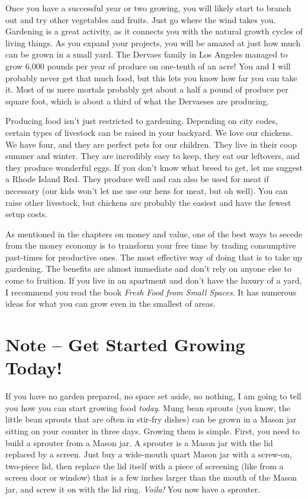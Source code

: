 Once you have a successful year or two growing, you will likely start to
branch out and try other vegetables and fruits. Just go where the wind
takes you. Gardening is a great activity, as it connects you with the
natural growth cycles of living things. As you expand your projects,
you will be amazed at just how much can be grown in a small yard. The
Dervaes family in Los Angeles managed to grow 6,000 pounds per year of
produce on one-tenth of an acre!  You and I will probably never get
that much food, but this lets you know how far you can take it. Most of
us mere mortals probably get about a half a pound of produce per square
foot, which is about a third of what
the Dervaeses are
producing.

Producing food isn’t just restricted to gardening. Depending on city
codes, certain types of livestock can be raised in your backyard. We
love our chickens. We have four, and they are perfect pets for our
children. They live in
their coop summer and winter. They are incredibly easy to keep, they
eat our leftovers, and they produce wonderful eggs. If you don’t know
what breed to get, let me suggest a Rhode Island Red. They produce well
and can also be used for meat if necessary (our kids won’t let me use
our hens for meat, but oh well). You can raise other livestock, but
chickens are probably the easiest and have the fewest setup costs.

As mentioned in the chapters on money and value, one of the best ways to
secede from the money economy is to transform your free time by trading
consumptive past-times for productive ones. The most effective way of
doing that is to take up gardening. The benefits are almost immediate
and don’t rely on anyone else to come to fruition. If you live in an
apartment and don’t have the luxury of a yard, I recommend you read the
book \textit{Fresh Food from Small Spaces}. It has numerous ideas for
what you can grow even in the smallest of areas.

\section{Note – Get Started Growing Today!}

If you have no garden prepared, no space set aside, no nothing, I am
going to tell you how you can start growing food \textit{today}. Mung
bean sprouts (you know, the little bean sprouts that are often in
stir-fry dishes) can be grown in a Mason jar sitting on your counter in
three days. Growing them is simple. First, you need to build a sprouter
from a Mason jar. A sprouter is a Mason jar with the lid replaced by a
screen. Just buy a wide-mouth quart Mason jar with a screw-on,
two-piece lid, then replace the lid itself with a piece of screening
(like from a screen door or window) that is a few inches larger than
the mouth of the Mason jar, and screw it on with the lid ring.
\textit{Voila!}  You now have a sprouter.

